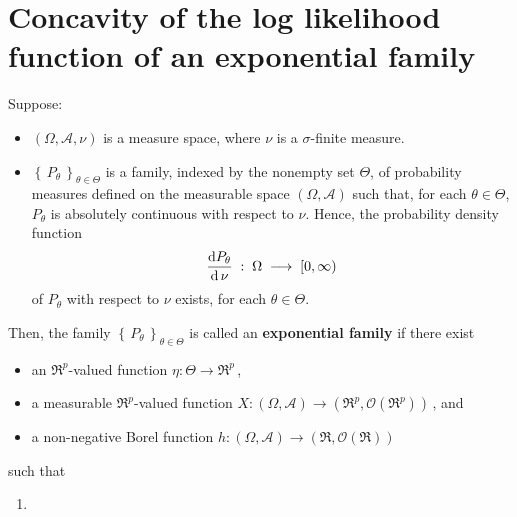 

\section{Concavity of the log likelihood function of an exponential family}
\setcounter{theorem}{0}
\setcounter{equation}{0}

\renewcommand{\theenumi}{\roman{enumi}}
\renewcommand{\labelenumi}{\textnormal{(\theenumi)}$\;\;$}


\begin{definition}
\mbox{}\vskip 0.1cm
\noindent
Suppose:
\begin{itemize}
\item
	$(\Omega,\mathcal{A},\nu)$ is a measure space, where $\nu$ is a $\sigma$-finite measure.
\item
	$\left\{\,P_{\theta}\,\right\}_{\theta \in \Theta}$ is a family, indexed by the nonempty set $\Theta$,
	of probability measures defined on the measurable space $(\Omega,\mathcal{A})$ such that,
	for each $\theta \in \Theta$, $P_{\theta}$ is absolutely continuous with respect to $\nu$.
	Hence, the probability density function
	\begin{equation*}
	\dfrac{\textnormal{d} P_{\theta}}{\textnormal{d}\,\nu} \; : \; \Omega \; \longrightarrow \; [0,\infty)
	\end{equation*}
	of $P_{\theta}$ with respect to $\nu$ exists, for each $\theta \in \Theta$.
\end{itemize}
Then, the family $\left\{\,P_{\theta}\,\right\}_{\theta \in \Theta}$ is called an \textbf{exponential family} if
there exist
\begin{itemize}
\item
	an $\Re^{p}$-valued function $\eta : \Theta \longrightarrow \Re^{p}$\,,
\item
	a measurable $\Re^{p}$-valued function $X : (\Omega,\mathcal{A}) \longrightarrow (\Re^{p},\mathcal{O}(\Re^{p}))$\,, and
\item
	a non-negative Borel function $h : (\Omega,\mathcal{A}) \longrightarrow (\Re,\mathcal{O}(\Re))$
\end{itemize}
such that
\begin{enumerate}
\item
	\begin{equation*}

\end{equation*}
\end{enumerate}
\end{definition}
